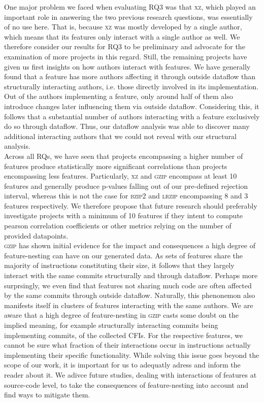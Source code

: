 One major problem we faced when evaluating RQ3 was that \textsc{xz}, which played an important role in answering the two previous research questions, was essentially of no use here.
That is, because \textsc{xz} was mostly developed by a single author, which means that its features only interact with a single author as well.
We therefore consider our results for RQ3 to be preliminary and advocate for the examination of more projects in this regard.
Still, the remaining projects have given us first insights on how authors interact with features.
We have generally found that a feature has more authors affecting it through outside dataflow than structurally interacting authors, i.e. those directly involved in its implementation.
Out of the authors implementing a feature, only around half of them also introduce changes later influencing them via outside dataflow.
Considering this, it follows that a substantial number of authors interacting with a feature exclusively do so through dataflow.
Thus, our dataflow analysis was able to discover many additional interacting authors that we could not reveal with our structural analysis. \\
Across all RQs, we have seen that projects encompassing a higher number of features produce statistically more significant correlations than projects encompassing less features.
Particularly, \textsc{xz} and \textsc{gzip} encompass at least 10 features and generally produce p-values falling out of our pre-defined rejection interval, whereas this is not the case for \textsc{bzip2} and \textsc{lrzip} encompassing 8 and 3 features respectively.
We therefore propose that future research should preferably investigate projects with a minimum of 10 features if they intent to compute pearson correlation coefficients or other metrics relying on the number of provided datapoints. \\
\textsc{gzip} has shown initial evidence for the impact and consequences a high degree of feature-nesting can have on our generated data.
As sets of features share the majority of instructions constituting their size, it follows that they largely interact with the same commits structurally and through dataflow.
Perhaps more surprsingly, we even find that features not sharing much code are often affected by the same commits through outside dataflow. %
Naturally, this phenonemon also manifests itself in clusters of features interacting with the same authors.
We are aware that a high degree of feature-nesting in \textsc{gzip} casts some doubt on the implied meaning, for example structurally interacting commits being implementing commits, of the collected CFIs.
For the respective features, we cannot be sure what fraction of their interactions occur in instructions actually implementing their specific functionality.
While solving this issue goes beyond the scope of our work, it is important for us to adequatly adress and inform the reader about it.
We adivce future studies, dealing with interactions of features at source-code level, to take the consequences of feature-nesting into account and find ways to mitigate them.

